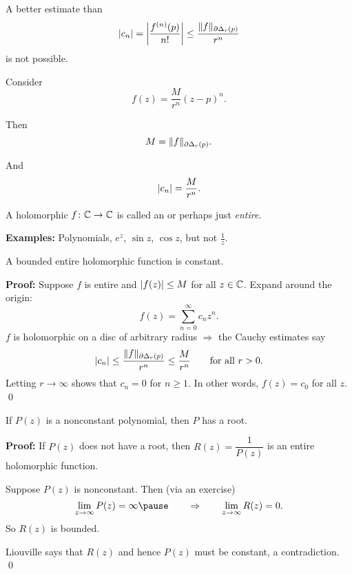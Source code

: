 \documentclass[10pt,aspectratio=169]{beamer}
\begin{document}
\begin{frame}

A better estimate than
\[
\lvert {c_n} \rvert =
\left\lvert {\frac{f^{(n)}(p)}{n!}} \right\rvert
\leq
\frac{\lVert {f} \rVert_{\partial \Delta_r(p)}}{r^{n}}
\]
is not possible.

\medskip
\pause

Consider \[
f(z) = \frac{M}{r^n} {(z-p)}^n .
\]

\medskip
\pause

Then
\[
M = \lVert {f} \rVert_{\partial \Delta_r(p)} .
\]

\medskip
\pause

And
\[
\lvert {c_n} \rvert = \frac{M}{r^n} .
\]

\end{frame}

\begin{frame}

\begin{definition}
A holomorphic $f \colon {\mathbb{C}} \to {\mathbb{C}}$ is called
an \emph{} or perhaps
just \emph{entire}.
\end{definition}

\pause

\textbf{Examples:} Polynomials, $e^z$, $\sin z$, $\cos z$, but not $\frac{1}{z}$.

\pause

\begin{theorem}[Liouville]
A bounded entire holomorphic function is constant.
\end{theorem}

\pause

\textbf{Proof:}
Suppose $f$ is entire and $\lvert {f(z)} \rvert \leq M$ for all $z \in {\mathbb{C}}$.
\pause
Expand around the origin:
\[
f(z) = \sum_{n=0}^\infty c_n z^n .
\]
\pause
$f$ is holomorphic on a disc of arbitrary radius
\pause \qquad $\Rightarrow$ \qquad
the Cauchy estimates say
\[
\lvert {c_n} \rvert \leq \frac{\lVert {f} \rVert_{\partial \Delta_r(p)}}{r^n} \leq
\frac{M}{r^n}
\qquad \text{for all } r > 0 .
\]
\pause
Letting $r \to \infty$ shows that $c_n = 0$ for $n \geq 1$.
\pause
In other
words, $f(z) = c_0$ for all $z$.
\qed

\end{frame}

\begin{frame}
\begin{theorem}
If $P(z)$ is a nonconstant polynomial, then $P$ has a root.
\end{theorem}

\pause

\textbf{Proof:}
If $P(z)$ does not have a root, then $R(z) = \dfrac{1}{P(z)}$ is
an entire holomorphic function.

\medskip
\pause

Suppose $P(z)$ is nonconstant.  Then (via an exercise)
\[
\lim_{z \to \infty} P(z) = \infty
\pause
\qquad \Rightarrow \qquad
\lim_{z \to \infty} R(z) = 0.
\]
\pause
So $R(z)$ is bounded.

\medskip
\pause

Liouville says that $R(z)$ and hence $P(z)$ must be constant, a
contradiction.
\qed
\end{frame}
\end{document}
